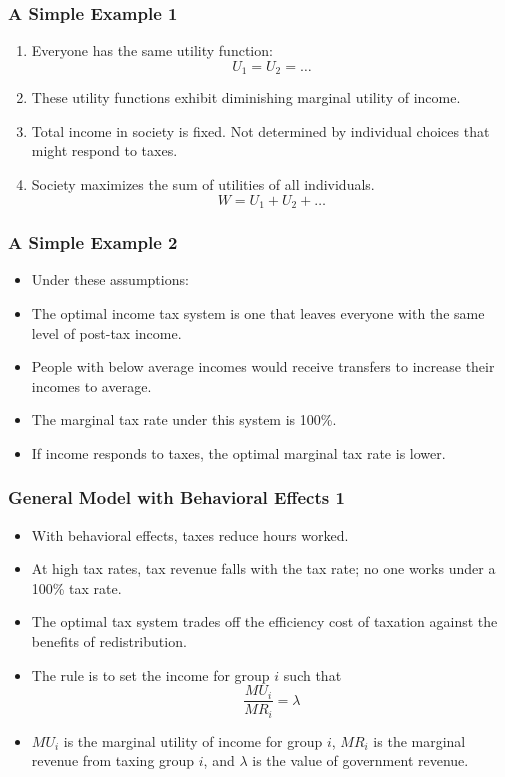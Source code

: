 \documentclass[aspectratio=169]{beamer}
\begin{document}
\begin{frame}
\frametitle{A Simple Example 1}
\begin{enumerate}
  \item Everyone has the same utility function:
  \begin{equation*}
    U_{1} = U_{2} = \ldots
  \end{equation*}
  \item These utility functions exhibit diminishing marginal utility of income.
  \item Total income in society is fixed. Not determined by individual choices that might respond to taxes.
  \item Society maximizes the sum of utilities of all individuals.
  \begin{equation*}
    W = U_{1} + U_{2} + \ldots
  \end{equation*}
\end{enumerate}
\end{frame}

\begin{frame}
\frametitle{A Simple Example 2}
\begin{itemize}
  \item Under these assumptions:
    \item The optimal income tax system is one that leaves everyone with the same level of post-tax income.
    \item People with below average incomes would receive transfers to increase their incomes to average.
    \item The marginal tax rate under this system is 100\%.
  \item If income responds to taxes, the optimal marginal tax rate is lower.
\end{itemize}
\end{frame}

\begin{frame}
\frametitle{General Model with Behavioral Effects 1}
\begin{itemize}
  \item With behavioral effects, taxes reduce hours worked. 
  \item At high tax rates, tax revenue falls with the tax rate; no one works under a 100\% tax rate. 
  \item The optimal tax system trades off the efficiency cost of taxation against the benefits of redistribution.
  \item The rule is to set the income for group $i$ such that
  \begin{equation*}
     \frac{MU_{i}}{MR_{i}} = \lambda
  \end{equation*}
  \item $MU_{i}$ is the marginal utility of income for group $i$, $MR_{i}$ is the marginal revenue from taxing group $i$, and $\lambda$ is the value of government revenue.
\end{itemize}
\end{frame}
\end{document}
